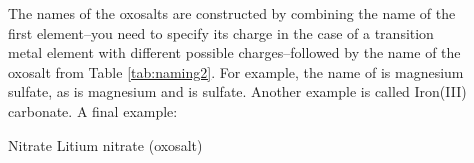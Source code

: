 \documentclass[main.tex]{subfiles}
\begin{document}
\begin{description}




\item[] 
The names of the oxosalts are constructed by combining the name of the first element--you need to specify its charge in the case of a transition metal element with different possible charges--followed by the name of the oxosalt from Table \ref{tab:naming2}. For example, the name of  is magnesium sulfate, as  is magnesium and  is sulfate. Another example is called Iron(III) carbonate. A final example:
 \begin{namingbox} {}
  \hfill Nitrate 	\hfill   {} \hfill Litium nitrate ({\small oxosalt})\\
\end{namingbox}


\end{description}
\end{document}

